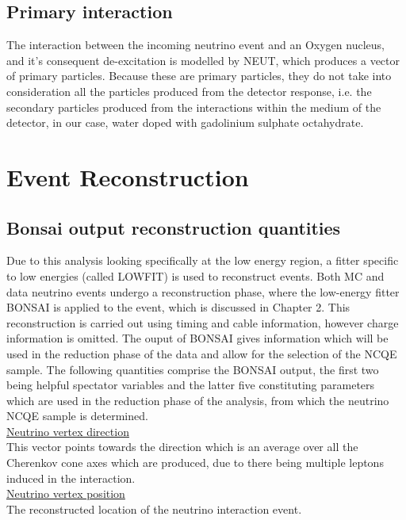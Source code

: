 \subsection{Primary interaction}

The interaction between the incoming neutrino event and an Oxygen nucleus, and it's consequent de-excitation is modelled by NEUT, which produces a vector of primary particles. Because these are primary particles, they do not take into consideration all the particles produced from the detector response, i.e. the secondary particles produced from the interactions within the medium of the detector, in our case, water doped with gadolinium sulphate octahydrate. 






\section{Event Reconstruction}
\subsection{Bonsai output reconstruction quantities}

Due to this analysis looking specifically at the low energy region, a fitter specific to low energies (called LOWFIT) is used to reconstruct events. Both MC and data neutrino events undergo a reconstruction phase, where the low-energy fitter BONSAI is applied to the event, which is discussed in Chapter 2. This reconstruction is carried out using timing and cable information, however charge information is omitted. The ouput of BONSAI gives information which will be used in the reduction phase of the data and allow for the selection of the NCQE sample. The following quantities comprise the BONSAI output, the first two being helpful spectator variables and the latter five constituting parameters which are used in the reduction phase of the analysis, from which the neutrino NCQE sample is determined.\\

\underline{Neutrino vertex direction}\\

This vector points towards the direction which is an average over all the Cherenkov cone axes which are produced, due to there being multiple leptons induced in the interaction.\\



\underline{Neutrino vertex position}\\
The reconstructed location of the neutrino interaction event.



